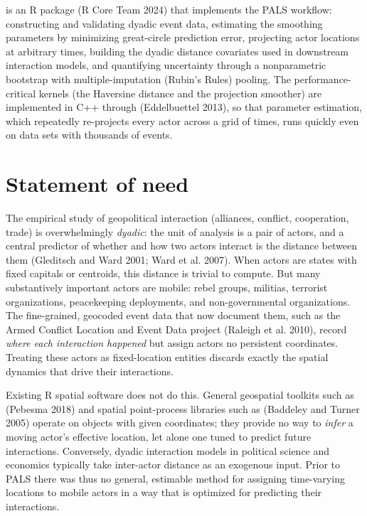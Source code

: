 \documentclass[10pt,a4paper,onecolumn]{article}
\let\textttOrig=\texttt
\def\texttt#1{\expandafter\textttOrig{\seqsplit{#1}}}
\begin{document}
\texttt{palsr} is an R package (R Core Team 2024) that implements the
PALS workflow: constructing and validating dyadic event data, estimating
the smoothing parameters by minimizing great-circle prediction error,
projecting actor locations at arbitrary times, building the dyadic
distance covariates used in downstream interaction models, and
quantifying uncertainty through a nonparametric bootstrap with
multiple-imputation (Rubin's Rules) pooling. The performance-critical
kernels (the Haversine distance and the projection smoother) are
implemented in C++ through \texttt{Rcpp} (Eddelbuettel 2013), so that
parameter estimation, which repeatedly re-projects every actor across a
grid of times, runs quickly even on data sets with thousands of events.

\section{Statement of need}\label{statement-of-need}

The empirical study of geopolitical interaction (alliances, conflict,
cooperation, trade) is overwhelmingly \emph{dyadic}: the unit of
analysis is a pair of actors, and a central predictor of whether and how
two actors interact is the distance between them (Gleditsch and Ward
2001; Ward et al. 2007). When actors are states with fixed capitals or
centroids, this distance is trivial to compute. But many substantively
important actors are mobile: rebel groups, militias, terrorist
organizations, peacekeeping deployments, and non-governmental
organizations. The fine-grained, geocoded event data that now document
them, such as the Armed Conflict Location and Event Data project
(Raleigh et al. 2010), record \emph{where each interaction happened} but
assign actors no persistent coordinates. Treating these actors as
fixed-location entities discards exactly the spatial dynamics that drive
their interactions.

Existing R spatial software does not do this. General geospatial
toolkits such as \texttt{sf} (Pebesma 2018) and spatial point-process
libraries such as \texttt{spatstat} (Baddeley and Turner 2005) operate
on objects with given coordinates; they provide no way to \emph{infer} a
moving actor's effective location, let alone one tuned to predict future
interactions. Conversely, dyadic interaction models in political science
and economics typically take inter-actor distance as an exogenous input.
Prior to PALS there was thus no general, estimable method for assigning
time-varying locations to mobile actors in a way that is optimized for
predicting their interactions.
\end{document}
